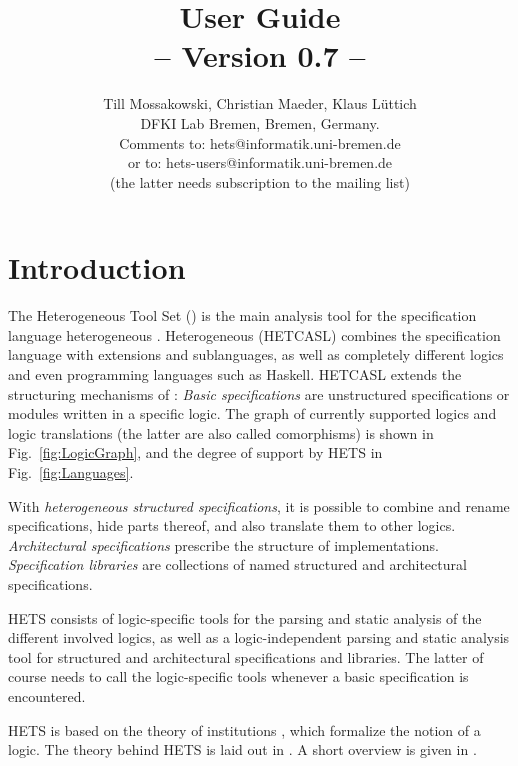 \documentclass{article}
\newcommand{\normalTEXTSC}[2]{{#1\scriptsize#2}}
\newcommand{\LARGETEXTSC} [2]{{\LARGE     #1\large     #2}}
\newcommand     {\Hets}{\normalTEXTSC{H}{ETS}\xspace}
\newcommand{\LARGEHets} {\LARGETEXTSC{H}{ETS}\xspace}
\newcommand{\HetCASL}{\normalTEXTSC{H}{ET}\normalTEXTSC{C}{ASL}\xspace}
\begin{document}
\title{{\bf \protect{\LARGEHets} User Guide}\\ 
-- Version 0.7 --}
\author{Till Mossakowski, Christian Maeder, Klaus L\"{u}ttich\\[1em]
DFKI Lab Bremen, Bremen, Germany.\\[1em]
Comments to: hets@informatik.uni-bremen.de\\
or to: hets-users@informatik.uni-bremen.de \\
(the latter needs subscription to the mailing list)
}

\maketitle

\section{Introduction}


The Heterogeneous Tool Set (\protect\Hets) is the main analysis tool
for the specification language heterogeneous \CASL. Heterogeneous
\CASL (\HetCASL) combines the specification language \CASL
\cite{CASL-UM,CASL/RefManual} with \CASL extensions
and sublanguages, as well as completely different logics and even
programming languages such as Haskell. \HetCASL
extends the structuring mechanisms of \CASL:
\emph{Basic specifications} are
unstructured specifications or modules written in a specific logic.
The graph of currently supported logics and logic translations (the
latter are also called comorphisms) is shown in
Fig.~\ref{fig:LogicGraph}, and the degree of support by \Hets in
Fig.~\ref{fig:Languages}.

With \emph{heterogeneous structured specifications}, it is possible to
combine and rename specifications, hide parts thereof, and also
translate them to other logics. \emph{Architectural specifications}
prescribe the structure of implementations.  \emph{Specification
  libraries} are collections of named structured and architectural
specifications. 

\Hets consists of logic-specific tools for the parsing and static
analysis of the different involved logics, as well as a
logic-independent parsing and static analysis tool for structured and
architectural specifications and libraries. The latter of course needs
to call the logic-specific tools whenever a basic specification is
encountered.

\Hets is based on the theory of institutions \cite{GoguenBurstall92},
which formalize the notion of a logic. The theory behind \Hets is
laid out in \cite{Habil}. A short overview is given in \cite{MossakowskiEA06}.
\end{document}
